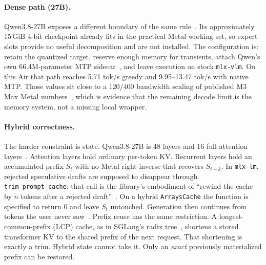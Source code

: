 \paragraph{Dense path (27B).}
Qwen3.8-27B exposes a different boundary of the same rule~\citep{qwen38card}. Its approximately 15\,GiB 4-bit checkpoint already fits in the practical Metal working set, so expert slots provide no useful decomposition and are not installed. The configuration is: retain the quantized target, reserve enough memory for transients, attach Qwen’s own 66.4M-parameter MTP sidecar~\citep{qwen3,mlxlm990}, and leave execution on stock \texttt{mlx-vlm}. On this Air that path reaches 5.71 tok/s greedy and 9.95--13.47 tok/s with native MTP. Those values sit close to a $120/400$ bandwidth scaling of published M3 Max Metal numbers~\citep{omlx2874}, which is evidence that the remaining decode limit is the memory system, not a missing local wrapper.

\paragraph{Hybrid correctness.}
The harder constraint is state. Qwen3.8-27B is 48 \gdn{} layers and 16 full-attention layers~\citep{yang2024gateddelta,qwen3}. Attention layers hold ordinary per-token KV. Recurrent layers hold an accumulated prefix $S_t$ with no Metal right-inverse that recovers $S_{t-k}$. In \texttt{mlx-lm}, rejected speculative drafts are supposed to disappear through \texttt{trim\_prompt\_cache}: that call is the library’s embodiment of ``rewind the cache by $n$ tokens after a rejected draft''~\citep{mlxlmcache,leviathan2023speculative}. On a hybrid \texttt{ArraysCache} the function is specified to return 0 and leave $S_t$ untouched. Generation then continues from tokens the user never saw~\citep{slotbankrepo}. Prefix reuse has the same restriction. A longest-common-prefix (LCP) cache, as in SGLang’s radix tree~\citep{zheng2024sglang}, shortens a stored transformer KV to the shared prefix of the next request. That shortening is exactly a trim. Hybrid state cannot take it. Only an \emph{exact} previously materialized prefix can be restored.

